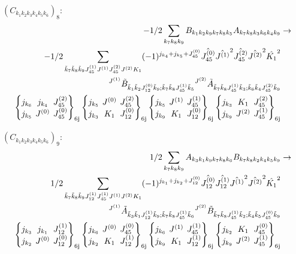 \documentclass[11pt]{article}
\newcommand{\sixj}[6]{\begingroup\setlength{\arraycolsep}{0.2em}\begin{Bmatrix} #1 & #2 & #3 \\ #4 & #5 & #6 \end{Bmatrix}_{\text{6j}}\endgroup}
\begin{document}
$\left({C}_{{k}_{1}{k}_{2}{k}_{3}{k}_{4}{k}_{5}{k}_{6}}\right)_{8}$:
\begin{align}
-1/2\sum_{{k}_{7}{k}_{8}{k}_{9}}{B}_{{k}_{1}{k}_{2}{k}_{9}{k}_{7}{k}_{8}{k}_{5}}{A}_{{k}_{7}{k}_{8}{k}_{3}{k}_{6}{k}_{4}{k}_{9}}&\rightarrow \notag \\-1/2\sum_{\tilde{k}_{7}\tilde{k}_{8}\tilde{k}_{9}J^{(1)}_{45}J^{(1)}J^{(2)}_{45}J^{(2)}K_{1}}(-1)^{j_{{k}_{4}} +j_{{k}_{5}} +J^{(0)}_{45} }\hat{J^{(0)}_{45}}\hat{J^{(1)}}^{2}\hat{J^{(2)}_{45}}\hat{J^{(2)}}^{2}\hat{K_{1}}^{2}& \notag \\{}^{J^{(1)}}\tilde{B}_{\tilde{k}_{1}\tilde{k}_{2}J^{(0)}_{12}\tilde{k}_{9};\tilde{k}_{7}\tilde{k}_{8}J^{(1)}_{45}\tilde{k}_{5}}{}^{J^{(2)}}\tilde{A}_{\tilde{k}_{7}\tilde{k}_{8}J^{(1)}_{45}\tilde{k}_{3};\tilde{k}_{6}\tilde{k}_{4}J^{(2)}_{45}\tilde{k}_{9}}& \notag \\\sixj{j_{{k}_{6}}}{j_{{k}_{4}}}{J^{(2)}_{45}}{j_{{k}_{5}}}{J^{(0)}}{J^{(0)}_{45}}\sixj{j_{{k}_{5}}}{J^{(0)}}{J^{(2)}_{45}}{j_{{k}_{3}}}{K_{1}}{J^{(0)}_{12}}\sixj{j_{{k}_{5}}}{J^{(1)}}{J^{(1)}_{45}}{j_{{k}_{9}}}{K_{1}}{J^{(0)}_{12}}\sixj{j_{{k}_{3}}}{K_{1}}{J^{(2)}_{45}}{j_{{k}_{9}}}{J^{(2)}}{J^{(1)}_{45}}
\end{align}

$\left({C}_{{k}_{1}{k}_{2}{k}_{3}{k}_{4}{k}_{5}{k}_{6}}\right)_{9}$:
\begin{align}
1/2\sum_{{k}_{7}{k}_{8}{k}_{9}}{A}_{{k}_{3}{k}_{1}{k}_{9}{k}_{7}{k}_{8}{k}_{6}}{B}_{{k}_{7}{k}_{8}{k}_{2}{k}_{4}{k}_{5}{k}_{9}}&\rightarrow \notag \\1/2\sum_{\tilde{k}_{7}\tilde{k}_{8}\tilde{k}_{9}J^{(1)}_{12}J^{(1)}_{45}J^{(1)}J^{(2)}K_{1}}(-1)^{j_{{k}_{1}} +j_{{k}_{2}} +J^{(0)}_{12} }\hat{J^{(0)}_{12}}\hat{J^{(1)}_{12}}\hat{J^{(1)}}^{2}\hat{J^{(2)}}^{2}\hat{K_{1}}^{2}& \notag \\{}^{J^{(1)}}\tilde{A}_{\tilde{k}_{3}\tilde{k}_{1}J^{(1)}_{12}\tilde{k}_{9};\tilde{k}_{7}\tilde{k}_{8}J^{(1)}_{45}\tilde{k}_{6}}{}^{J^{(2)}}\tilde{B}_{\tilde{k}_{7}\tilde{k}_{8}J^{(1)}_{45}\tilde{k}_{2};\tilde{k}_{4}\tilde{k}_{5}J^{(0)}_{45}\tilde{k}_{9}}& \notag \\\sixj{j_{{k}_{3}}}{j_{{k}_{1}}}{J^{(1)}_{12}}{j_{{k}_{2}}}{J^{(0)}}{J^{(0)}_{12}}\sixj{j_{{k}_{6}}}{J^{(0)}}{J^{(0)}_{45}}{j_{{k}_{2}}}{K_{1}}{J^{(1)}_{12}}\sixj{j_{{k}_{6}}}{J^{(1)}}{J^{(1)}_{45}}{j_{{k}_{9}}}{K_{1}}{J^{(1)}_{12}}\sixj{j_{{k}_{2}}}{K_{1}}{J^{(0)}_{45}}{j_{{k}_{9}}}{J^{(2)}}{J^{(1)}_{45}}
\end{align}
\end{document}
